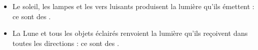 \begin{mybilan}
	\begin{itemize}
		\item Le soleil, les lampes et les vers luisants produisent la lumière qu'ils émettent : ce sont des .
		\item La Lune et tous les objets éclairés renvoient la lumière qu'ils reçoivent dans toutes les directions : ce sont des .
	\end{itemize}
\end{mybilan}